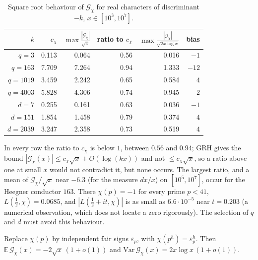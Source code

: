 \begin{table}[h]
\centering\small
\begin{tabular}{@{}rrrrrr@{}}
\toprule
$k$ & $c_\chi$ & $\max\frac{|\mathcal G_\chi|}{\sqrt x}$ & ratio to $c_\chi$ & $\max\frac{|\mathcal G_\chi|}{\sqrt{2x\log x}}$ & bias\\
\midrule
$q=3$ & 0.113 & 0.064 & 0.56 & 0.016 & $-1$\\
$q=163$ & 7.709 & 7.264 & 0.94 & 1.333 & $-12$\\
$q=1019$ & 3.459 & 2.242 & 0.65 & 0.584 & $4$\\
$q=4003$ & 5.828 & 4.306 & 0.74 & 0.945 & $2$\\
$d=7$ & 0.255 & 0.161 & 0.63 & 0.036 & $-1$\\
$d=151$ & 1.854 & 1.458 & 0.79 & 0.374 & $4$\\
$d=2039$ & 3.247 & 2.358 & 0.73 & 0.519 & $4$\\
\bottomrule
\end{tabular}
\caption{Square root behaviour of $\mathcal G_\chi$ for real characters of discriminant $-k$, $x\in[10^3,10^7]$.}\label{mq:tab:sqrt}
\end{table}

In every row the ratio to $c_\chi$ is below $1$, between $0.56$ and $0.94$; GRH gives the bound $|\mathcal G_\chi(x)|\le c_\chi\sqrt x+O(\log(kx))$ and not $\le c_\chi\sqrt x$, so a ratio above one at small $x$ would not contradict it, but none occurs. The largest ratio, and a mean of $\mathcal G_\chi/\sqrt x$ near $-6.3$ (for the measure $dx/x$) on $[10^5,10^7]$, occur for the Heegner conductor $163$. There $\chi(p)=-1$ for every prime $p<41$, $L(\frac12,\chi)=0.0685$, and $|L(\frac12+it,\chi)|$ is as small as $6.6\cdot10^{-5}$ near $t=0.203$ (a numerical observation, which does not locate a zero rigorously). The selection of $q$ and $d$ must avoid this behaviour.

\begin{proposition}\label{mq:prop:random}
Replace $\chi(p)$ by independent fair signs $\varepsilon_p$, with $\chi(p^h)=\varepsilon_p^h$. Then $\mathbb E\,\mathcal G_\chi(x)=-2\sqrt x\,(1+o(1))$ and $\mathrm{Var}\,\mathcal G_\chi(x)=2x\log x\,(1+o(1))$.
\end{proposition}

